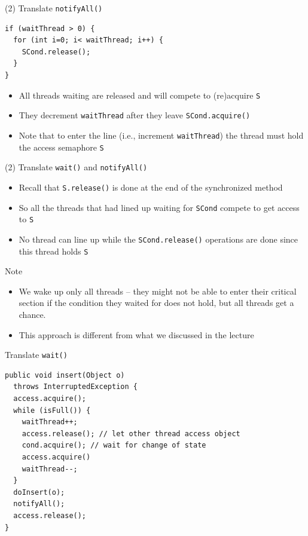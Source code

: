 \begin{frame}[fragile]{(2) Translate \lstinline!notifyAll()!}
\begin{lstlisting}
if (waitThread > 0) {
  for (int i=0; i< waitThread; i++) { 
    SCond.release();
  }
}	
\end{lstlisting}


  \begin{itemize}
  \item All threads waiting are released and will compete to
    (re)acquire \lstinline!S!
  \item They decrement \lstinline!waitThread! after they leave
    \lstinline!SCond.acquire()!
  \item Note that to enter the line (i.e., increment
    \lstinline!waitThread!) the thread must hold the access semaphore
    \lstinline!S!
  \end{itemize}
\end{frame}

\begin{frame}{(2) Translate \lstinline!wait()! and \lstinline!notifyAll()!}
  \begin{itemize}
  \item Recall that \lstinline!S.release()! is done at the end of the
    synchronized method
  \item So all the threads that had lined up waiting for
    \lstinline!SCond! compete to get access to \lstinline!S!
  \item No thread can line up while the \lstinline!SCond.release()!
    operations are done since this thread holds \lstinline!S!
  \end{itemize}
\end{frame}

\begin{frame}{Note}
  \begin{itemize}
  \item We wake up only all threads -- they might not be able to enter
    their critical section if the condition they waited for does not
    hold, but all threads get a chance.
  \item This approach is different from what we discussed in the
    lecture
  \end{itemize}
\end{frame}

\begin{frame}[fragile]{Translate \lstinline!wait()!}
\begin{lstlisting}[basicstyle=\fontsize{9}{11}\selectfont\ttfamily]
public void insert(Object o)
  throws InterruptedException {
  access.acquire();
  while (isFull()) {
    waitThread++;
    access.release(); // let other thread access object
    cond.acquire(); // wait for change of state
    access.acquire()
    waitThread--;
  }
  doInsert(o);	
  notifyAll();
  access.release();
}
\end{lstlisting}
\end{frame}

